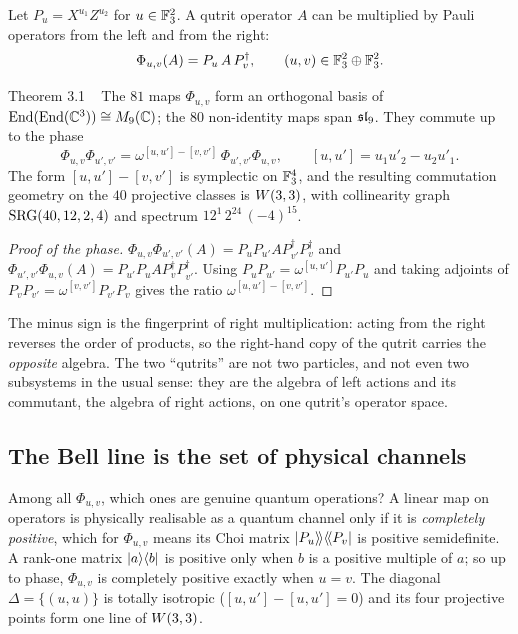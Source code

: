 Let $P_u=X^{u_1}Z^{u_2}$ for $u\in\mathbb{F}_3^2$. A qutrit operator $A$ can be multiplied by
Pauli operators from the left and from the right:
\[
\Phi_{u,v}(A)=P_u\,A\,P_v^\dagger ,\qquad (u,v)\in\mathbb{F}_3^2\oplus\mathbb{F}_3^2 .
\]

\begin{result}{Theorem 3.1 \hfill \tierT\ \tierC}
The $81$ maps $\Phi_{u,v}$ form an orthogonal basis of $\mathrm{End}(\mathrm{End}(\mathbb{C}^3))\cong M_9(\mathbb{C})$;
the $80$ non-identity maps span $\mathfrak{sl}_9$. They commute up to the phase
\[
\Phi_{u,v}\Phi_{u',v'}=\omega^{[u,u']-[v,v']}\,\Phi_{u',v'}\Phi_{u,v},
\qquad [u,u']=u_1u'_2-u_2u'_1 .
\]
The form $[u,u']-[v,v']$ is symplectic on $\mathbb{F}_3^4$, and the resulting commutation
geometry on the $40$ projective classes is $W(3,3)$, with collinearity graph
$\mathrm{SRG}(40,12,2,4)$ and spectrum $12^1\,2^{24}\,(-4)^{15}$.
\end{result}

\begin{proof}[Proof of the phase]
$\Phi_{u,v}\Phi_{u',v'}(A)=P_uP_{u'}AP_{v'}^\dagger P_v^\dagger$ and
$\Phi_{u',v'}\Phi_{u,v}(A)=P_{u'}P_uAP_v^\dagger P_{v'}^\dagger$. Using
$P_uP_{u'}=\omega^{[u,u']}P_{u'}P_u$ and taking adjoints of
$P_vP_{v'}=\omega^{[v,v']}P_{v'}P_v$ gives the ratio $\omega^{[u,u']-[v,v']}$.
\end{proof}

The minus sign is the fingerprint of right multiplication: acting from the right reverses
the order of products, so the right-hand copy of the qutrit carries the \emph{opposite}
algebra. The two ``qutrits'' are not two particles, and not even two subsystems in the
usual sense: they are the algebra of left actions and its commutant, the algebra of right
actions, on one qutrit's operator space.

\subsection{The Bell line is the set of physical channels}

Among all $\Phi_{u,v}$, which ones are genuine quantum operations? A linear map on
operators is physically realisable as a quantum channel only if it is \emph{completely
positive}, which for $\Phi_{u,v}$ means its Choi matrix
$\lvert P_u\rangle\!\rangle\langle\!\langle P_v\rvert$ is positive semidefinite. A rank-one matrix
$\lvert a\rangle\langle b\rvert$ is positive only when $b$ is a positive multiple of $a$; so up to phase,
$\Phi_{u,v}$ is completely positive exactly when $u=v$. The diagonal
$\Delta=\{(u,u)\}$ is totally isotropic ($[u,u']-[u,u']=0$) and its four projective points
form one line of $W(3,3)$.

